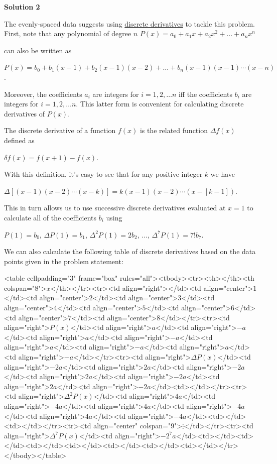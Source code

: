 \begin{enumerate}
\textbf{Solution 2}

The evenly-spaced data suggests using \href{https://artofproblemsolving.com/wiki/index.php?title=Discrete\_derivative}{discrete derivatives} to tackle this problem.  First, note that any polynomial of degree $n$
$P(x) = a_0 + a_1 x + a_2 x^2 + \ldots + a_n x^n$

 can also be written as

 $P(x) = b_0 + b_1 (x-1) + b_2 (x-1)(x-2) + \ldots + b_n (x-1)(x-1) \cdots (x-n)$.

 Moreover, the coefficients $a_i$ are integers for $i=1, 2, \ldots n$ iff the coefficients $b_i$ are integers for $i=1, 2, \ldots n$.  This latter form is convenient for calculating discrete derivatives of $P(x)$.

 The discrete derivative of a function $f(x)$ is the related function $\Delta f(x)$ defined as

 $\delta f(x) = f(x+1) - f(x)$.

 With this definition, it's easy to see that for any positive integer $k$ we have

 $\Delta [(x-1)(x-2)\cdots(x-k)] = k(x-1)(x-2)\cdots(x-[k-1])$.

 This in turn allows us to use successive discrete derivatives evaluated at $x=1$ to calculate all of the coefficients $b_i$ using

 $P(1) = b_0$, $\Delta P(1) = b_1$, $\Delta^2 P(1) = 2 b_2$, $\ldots$, $\Delta^7 P(1) = 7! b_7$.

 We can also calculate the following table of discrete derivatives based on the data points given in the problem statement:

 <table cellpadding="3" frame="box" rules="all"><tbody><tr><th></th><th colspan="8">$x$</th></tr><tr><td align="right"></td><td align="center">$1$</td><td align="center">$2$</td><td align="center">$3$</td><td align="center">$4$</td><td align="center">$5$</td><td align="center">$6$</td><td align="center">$7$</td><td align="center">$8$</td></tr><tr><td align="right">$P(x)$</td><td align="right">$a$</td><td align="right">$-a$</td><td align="right">$a$</td><td align="right">$-a$</td><td align="right">$a$</td><td align="right">$-a$</td><td align="right">$a$</td><td align="right">$-a$</td></tr><tr><td align="right">$\Delta P(x)$</td><td align="right">$-2a$</td><td align="right">$2a$</td><td align="right">$-2a$</td><td align="right">$2a$</td><td align="right">$-2a$</td><td align="right">$2a$</td><td align="right">$-2a$</td><td></td></tr><tr><td align="right">$\Delta^2 P(x)$</td><td align="right">$4a$</td><td align="right">$-4a$</td><td align="right">$4a$</td><td align="right">$-4a$</td><td align="right">$4a$</td><td align="right">$-4a$</td><td></td><td></td></tr><tr><td align="center" colspan="9">$\vdots$</td></tr><tr><td align="right">$\Delta^7 P(x)$</td><td align="right">$-2^7 a$</td><td></td><td></td><td></td><td></td><td></td><td></td><td></td></tr></tbody></table>


\end{enumerate}
